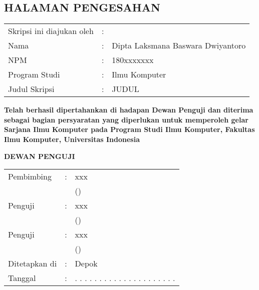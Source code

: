 \newpage
\begin{center}
    \section*{\centering HALAMAN PENGESAHAN}
\end{center}
\thispagestyle{nouniversityname}
{
    \begin{tabular}{@{}l c p{}}
        Skripsi ini diajukan oleh &: & \\
        Nama &: & Dipta Laksmana Baswara Dwiyantoro \\
        NPM &: & 180xxxxxxx \\
        Program Studi &: & Ilmu Komputer \\
        Judul Skripsi &: & JUDUL
    \end{tabular}
}
\vspace{1cm}
\justifying
\newline
\large
\begin{spacing}{1.15}
\noindent 
\textbf{Telah berhasil dipertahankan di hadapan Dewan Penguji dan diterima sebagai
bagian persyaratan yang diperlukan untuk memperoleh gelar Sarjana Ilmu
Komputer pada Program Studi Ilmu Komputer, Fakultas Ilmu Komputer,
Universitas Indonesia
}
\end{spacing}
\begin{center}
    \large
    \textbf{DEWAN PENGUJI}\\
\end{center}
{
    \begin{tabular}{@{}l c l}
        Pembimbing &: &xxx  \\
         & &(\hspace{5cm})  \\[1.5cm]
        Penguji &: &xxx  \\
         & &(\hspace{5cm})  \\[1.5cm]
        Penguji &: &xxx  \\
         & &(\hspace{5cm})  \\[1.5cm]
        Ditetapkan di &: &Depok  \\
        Tanggal &: &. . . . . . . . . . . . . . . . . . . . .
    \end{tabular}
}